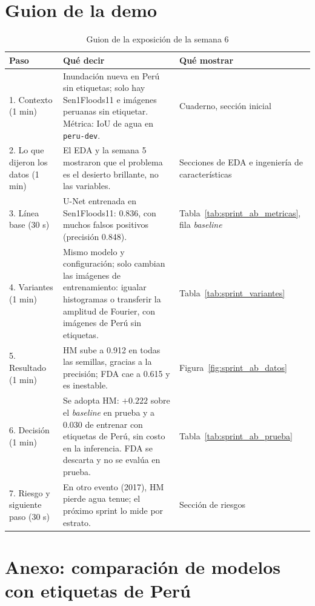\section{Guion de la demo}

\begin{table}[H]
    \centering
    \small
    \caption{Guion de la exposición de la semana 6}
    \label{tab:sprint_demo}
    \begin{tabular}{|p{3.0cm}|p{7.6cm}|p{3.8cm}|}
        \hline
        \textbf{Paso} & \textbf{Qué decir} & \textbf{Qué mostrar} \\
        \hline
        1. Contexto (1 min) & Inundación nueva en Perú sin etiquetas; solo hay Sen1Floods11 e imágenes peruanas sin etiquetar. Métrica: IoU de agua en \texttt{peru-\allowbreak{}dev}. & Cuaderno, sección inicial \\
        \hline
        2. Lo que dijeron los datos (1 min) & El EDA y la semana 5 mostraron que el problema es el desierto brillante, no las variables. & Secciones de EDA e ingeniería de características \\
        \hline
        3. Línea base (30 s) & U-Net entrenada en Sen1Floods11: 0.836, con muchos falsos positivos (precisión 0.848). & Tabla~\ref{tab:sprint_ab_metricas}, fila \textit{baseline} \\
        \hline
        4. Variantes (1 min) & Mismo modelo y configuración; solo cambian las imágenes de entrenamiento: igualar histogramas o transferir la amplitud de Fourier, con imágenes de Perú sin etiquetas. & Tabla~\ref{tab:sprint_variantes} \\
        \hline
        5. Resultado (1 min) & HM sube a 0.912 en todas las semillas, gracias a la precisión; FDA cae a 0.615 y es inestable. & Figura~\ref{fig:sprint_ab_datos} \\
        \hline
        6. Decisión (1 min) & Se adopta HM: $+0.222$ sobre el \textit{baseline} en prueba y a 0.030 de entrenar con etiquetas de Perú, sin costo en la inferencia. FDA se descarta y no se evalúa en prueba. & Tabla~\ref{tab:sprint_ab_prueba} \\
        \hline
        7. Riesgo y siguiente paso (30 s) & En otro evento (2017), HM pierde agua tenue; el próximo sprint lo mide por estrato. & Sección de riesgos \\
        \hline
    \end{tabular}
\end{table}

\section{Anexo: comparación de modelos con etiquetas de Perú}

